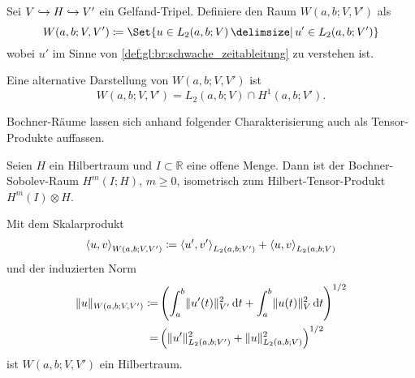 \begin{Definition}
\label{def:gl:br:bochner_raum_W}
    Sei $V \hookrightarrow H \hookrightarrow V'$ ein Gelfand-Tripel.
    Definiere den Raum $W(a, b; V, V')$ als
    \begin{equation}
        W(a, b; V, V') \deq \Set{u \in L_{2}(a, b; V) \given u' \in L_{2}(a, b; V')}
    \end{equation}
    wobei $u'$ im Sinne von \cref{def:gl:br:schwache_zeitableitung} zu verstehen ist.
\end{Definition}

\begin{Bemerkung}
\label{bem:gl:br:bochner_alternative_darstellung}
    Eine alternative Darstellung von $W(a, b; V, V')$ ist
    \begin{equation}
        W(a, b; V, V') = L_{2}(a, b; V) \cap H^{1}(a, b; V').
    \end{equation}
\end{Bemerkung}

Bochner-Räume lassen sich anhand folgender Charakterisierung auch als Tensor-Produkte auffassen.
\begin{Satz}
\label{satz:gl:br:bochner_als_tensorprodukt}
    Seien $H$ ein Hilbertraum und $I \subset \mathbb{R}$ eine offene Menge.
    Dann ist der Bochner-Sobolev-Raum $H^{m}(I; H)$, $m \geq 0$, isometrisch zum Hilbert-Tensor-Produkt $H^{m}(I) \otimes H$.
\end{Satz}

\begin{Lemma}
\label{lem:gl:br:bochner_W_ist_hilbertraum}
    Mit dem Skalarprodukt
    \begin{equation}
        \left\langle u,v\right\rangle_{W(a, b; V, V')} \coloneqq \left\langle u',v'\right\rangle_{L_{2}(a, b; V')} +  \left\langle u,v\right\rangle_{L_{2}(a, b; V)}
    \end{equation}
    und der induzierten Norm
    \begin{equation}
        \begin{aligned}
            \lVert u\rVert_{W(a, b; V, V')}
            \coloneqq& \left( \int_{a}^{b} \lVert u'(t)\rVert_{V'}^{2} \mathop{}\!\mathrm{d} t + \int_{a}^{b} \lVert u(t)\rVert_{V}^{2} \mathop{}\!\mathrm{d} t \right)^{1/2}
            \\=& \left( \lVert u'\rVert_{L_{2}(a, b; V')}^{2} + \lVert u\rVert_{L_{2}(a, b; V)}^{2} \right)^{1/2}
        \end{aligned}
    \end{equation}
    ist $W(a, b; V, V')$ ein Hilbertraum.
\end{Lemma}

